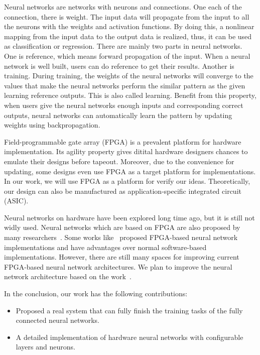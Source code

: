 \documentclass[conference]{IEEEtran}
\begin{document}
Neural networks are networks with neurons and connections. One each of the connection, there is weight. The input data will propagate from the input to all the neurons with the weights and activation functions. By doing this, a nonlinear mapping from the input data to the output data is realized, thus, it can be used as classification or regression. There are mainly two parts in neural networks. One is reference, which means forward propagation of the input. When a neural network is well built, users can do reference to get their results. Another is training. During training, the weights of the neural networks will converge to the values that make the neural networks perform the similar pattern as the given learning reference outputs. This is also called learning. Benefit from this property, when users give the neural networks enough inputs and corresponding correct outputs, neural networks can automatically learn the pattern by updating weights using backpropagation.

Field-programmable gate array (FPGA) is a prevalent platform for hardware implementation. Its agility property gives ditital hardware designers chances to emulate their designs before tapeout. Moreover, due to the convenience for updating, some designs even use FPGA as a target platform for implementations. In our work, we will use FPGA as a platform for verify our ideas. Theoretically, our design can also be manufactured as application-specific integrated circuit (ASIC).

Neural networks on hardware have been explored long time ago, but it is still not widly used. Neural networks which are based on FPGA are also proposed by many researchers~\cite{FPGAbook}. Some works like~\cite{hytnh17,seok02} proposed FPGA-based neural network implementations and have advantages over normal software-based implementations. However, there are still many spaces for improving current FPGA-based neural network architectures. We plan to improve the neural network architecture based on the work~\cite{hytnh17}.

In the conclusion, our work has the following contributions:
\begin{itemize}
\item Proposed a real system that can fully finish the training tasks of the fully connected neural networks. 
\item A detailed implementation of hardware neural networks with configurable layers and neurons.
\end{itemize}
\end{document}
